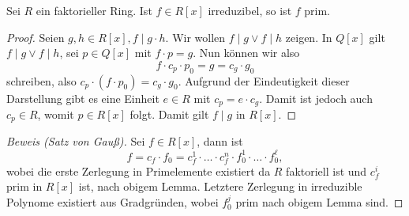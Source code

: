 \begin{lemma}
    Sei $R$ ein faktorieller Ring. Ist $f \in R[x]$ irreduzibel, so ist $f$ prim.
\end{lemma}

\begin{proof}
    Seien $g, h \in R[x], f \mid g \cdot h$. Wir wollen $f \mid g \lor f \mid h$ zeigen. In $Q[x]$ gilt $f \mid g \lor f \mid h$, \obda sei $p \in Q[x]$ mit $f \cdot p = g$. Nun können wir also
    $$ f \cdot c_p \cdot p_0 = g = c_g \cdot g_0 $$
    schreiben, also $c_p \cdot (f \cdot p_0) = c_g \cdot g_0$. Aufgrund der Eindeutigkeit dieser Darstellung gibt es eine Einheit $e \in R$ mit $c_p = e \cdot c_g$. Damit ist jedoch auch $c_p \in R$, womit $p \in R[x]$ folgt. Damit gilt $f \mid g$ in $R[x]$.
\end{proof}

\begin{proof}[Beweis (Satz von Gauß)]
    Sei $f \in R[x]$, dann ist
    $$ f = c_f \cdot f_0 = c_f^1 \cdot \hdots \cdot c_f^n \cdot f_0^1 \cdot \hdots \cdot f_0^\ell, $$
    wobei die erste Zerlegung in Primelemente existiert da $R$ faktoriell ist und $c_f^i$ prim in $R[x]$ ist, nach obigem Lemma. Letztere Zerlegung in irreduzible Polynome existiert aus Gradgründen, wobei $f_0^j$ prim nach obigem Lemma sind.
\end{proof}